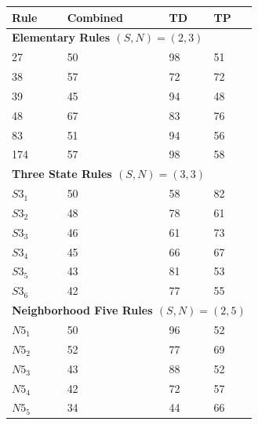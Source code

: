 \documentclass{elsarticle}
\begin{document}
\begin{multicols}{2}
	\fi
	
	
	\begin{table}[H] \centering
		\small
		\begin{tabular}{|l|l|l|l|}
			\hline
			\textbf{Rule}  & \textbf{Combined} & \textbf{TD} & \textbf{TP} \\ \hline
			\multicolumn{4}{|l|}{\textbf{Elementary Rules \boldmath$(S,N) = (2,3)$}} \\ 
			\hline
			27             & 50                & 98          & 51          \\ \hline
			38             & 57                & 72          & 72          \\ \hline
			39             & 45                & 94          & 48          \\ \hline
			48             & 67                & 83          & 76          \\ \hline
			83             & 51                & 94          & 56          \\ \hline
			174            & 57                & 98          & 58          \\ \hline
			\multicolumn{4}{|l|}{\textbf{Three State Rules \boldmath$(S,N) = (3,3)$}} \\ 
			\hline
			$S3_{1}$       & 50                & 58          & 82          \\ \hline
			$S3_{2}$       & 48                & 78          & 61          \\ \hline
			$S3_{3}$       & 46                & 61          & 73          \\ \hline
			$S3_{4}$       & 45                & 66          & 67          \\ \hline
			$S3_{5}$       & 43                & 81          & 53          \\ \hline
			$S3_{6}$       & 42                & 77          & 55          \\ \hline
			\multicolumn{4}{|l|}{\textbf{Neighborhood Five Rules \boldmath$(S,N) = (2,5)$}} 
			\\ \hline
			$N5_{1}$       & 50                & 96          & 52          \\ \hline
			$N5_{2}$       & 52                & 77          & 69          \\ \hline
			$N5_{3}$       & 43                & 88          & 52          \\ \hline
			$N5_{4}$       & 42                & 72          & 57          \\ \hline
			$N5_{5}$       & 34                & 44          & 66          \\  \hline

\end{tabular}
\end{table}
\end{multicols}
\end{document}
